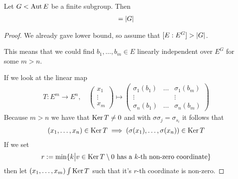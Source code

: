 \begin{prop}[]\label{prop:4-9}
  Let $G < \operatorname{Aut} E$ be a finite subgroup. Then
  \begin{align*}
    [E:E^{G}] = \abs{G}
  \end{align*}
\end{prop}
\begin{proof}
  We already gave lower bound, so assume that $[E:E^{G}] > \vert G\vert$.

  This means that we could find $b_{1}, \ldots, b_{m} \in E$ linearly independent over $E^{G}$ for some $m > n$.

  If we look at the linear map
  \begin{align*}
    T: E^{m} \to E^{n}, \quad \begin{pmatrix}
    x_1\\
    \vdots\\
    x_m
    \end{pmatrix}
    \mapsto 
    \begin{pmatrix}
      \sigma_1(b_1) & \ldots & \sigma_1(b_m)\\
    \vdots &  & \vdots\\
    \sigma_n(b_1) & \ldots & \sigma_n(b_m)
    \end{pmatrix}
  \end{align*}
  Because $m > n$ we have that $\operatorname{Ker} T \neq 0$ and with $\sigma \sigma_j = \sigma_{s_i}$ it follows that 
  \begin{align*}
    (x_1,\ldots,x_n) \in \operatorname{Ker} T \implies (\sigma(x_1),\ldots,\sigma(x_n)) \in \operatorname{Ker} T
  \end{align*}
  If we set
  \begin{align*}
    r := \min \{k \big\vert v \in \operatorname{Ker} T \setminus 0 \text{ has a $k$-th non-zero coordinate}\}
  \end{align*}
  then let $(x_1,\ldots,x_m) \int \operatorname{Ker} T$ such that it's $r$-th coordinate is non-zero.


\end{proof}
